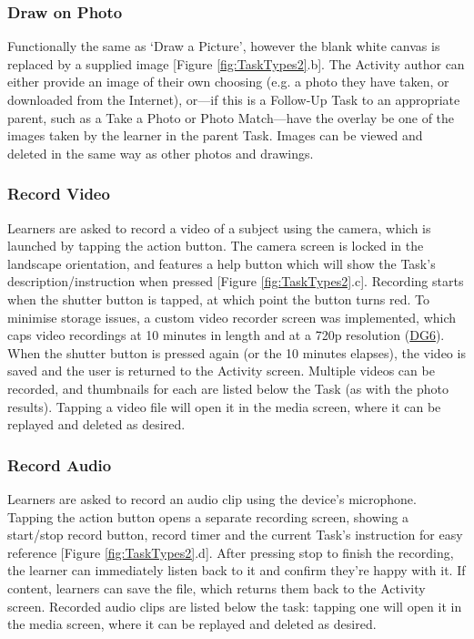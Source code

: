 \subsubsection*{Draw on Photo}
Functionally the same as `Draw a Picture', however the blank white canvas is replaced by a supplied image [Figure \ref{fig:TaskTypes2}.b]. The Activity author can either provide an image of their own choosing (e.g. a photo they have taken, or downloaded from the Internet), or---if this is a Follow-Up Task to an appropriate parent, such as a Take a Photo or Photo Match---have the overlay be one of the images taken by the learner in the parent Task. Images can be viewed and deleted in the same way as other photos and drawings.

\subsubsection*{Record Video}
Learners are asked to record a video of a subject using the camera, which is launched by tapping the action button. The camera screen is locked in the landscape orientation, and features a help button which will show the Task's description/instruction when pressed [Figure \ref{fig:TaskTypes2}.c]. Recording starts when the shutter button is tapped, at which point the button turns red. To minimise storage issues, a custom video recorder screen was implemented, which caps video recordings at 10 minutes in length and at a 720p resolution (\hyperref[DG6]{DG6}). When the shutter button is pressed again (or the 10 minutes elapses), the video is saved and the user is returned to the Activity screen. Multiple videos can be recorded, and thumbnails for each are listed below the Task (as with the photo results). Tapping a video file will open it in the media screen, where it can be replayed and deleted as desired.

\subsubsection*{Record Audio}
Learners are asked to record an audio clip using the device's microphone. Tapping the action button opens a separate recording screen, showing a start/stop record button, record timer and the current Task's instruction for easy reference [Figure \ref{fig:TaskTypes2}.d]. After pressing stop to finish the recording, the learner can immediately listen back to it and confirm they're happy with it. If content, learners can save the file, which returns them back to the Activity screen. Recorded audio clips are listed below the task: tapping one will open it in the media screen, where it can be replayed and deleted as desired.

